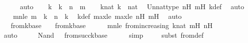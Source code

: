 \begin{isabellebody}
\ \ \ \ \isamarkupfalse%
\ auto\isanewline
\isanewline
\ \ \isamarkupfalse%
\ k\ \ {\isachardoublequoteopen}k\ {\isasymequiv}\ n\ {\isasymunion}\ m{\isachardoublequoteclose}\isanewline
\isanewline
\ \ \isamarkupfalse%
\ knat{\isacharcolon}{\kern0pt}\ {\isachardoublequoteopen}k\ {\isasymin}\ nat{\isachardoublequoteclose}\ \isamarkupfalse%
\ Un{\isacharunderscore}{\kern0pt}nat{\isacharunderscore}{\kern0pt}type\ nH\ mH\ k{\isacharunderscore}{\kern0pt}def\ \isamarkupfalse%
\ auto\isanewline
\ \ \isamarkupfalse%
\ mnle{\isacharcolon}{\kern0pt}\ {\isachardoublequoteopen}m\ {\isasymle}\ k\ {\isasymand}\ n\ {\isasymle}\ k{\isachardoublequoteclose}\ \isamarkupfalse%
\ k{\isacharunderscore}{\kern0pt}def\ max{\isacharunderscore}{\kern0pt}le{}\ max{\isacharunderscore}{\kern0pt}le{}\ nH\ mH\ \isamarkupfalse%
\ auto\isanewline
\ \ \isanewline
\ \ \isamarkupfalse%
\ {\isachardoublequoteopen}{\isasymphi}\ {\isasymin}\ {\isasymDelta}{}{\isacharunderscore}{\kern0pt}from{\isacharcircum}{\kern0pt}k{\isacharparenleft}{\kern0pt}{\isasymDelta}{}{\isacharunderscore}{\kern0pt}base{\isacharparenright}{\kern0pt}\ {\isasymand}\ {\isasympsi}\ {\isasymin}\ {\isasymDelta}{}{\isacharunderscore}{\kern0pt}from{\isacharcircum}{\kern0pt}k{\isacharparenleft}{\kern0pt}{\isasymDelta}{}{\isacharunderscore}{\kern0pt}base{\isacharparenright}{\kern0pt}{\isachardoublequoteclose}\isanewline
\ \ \ \ \isamarkupfalse%
\ mnle\ {\isasymDelta}{}{\isacharunderscore}{\kern0pt}from{\isacharunderscore}{\kern0pt}increasing\ knat\ mH\ nH\ \isanewline
\ \ \ \ \isamarkupfalse%
\ auto\isanewline
\ \ \isamarkupfalse%
\ \isamarkupfalse%
\ {\isachardoublequoteopen}Nand{\isacharparenleft}{\kern0pt}{\isasymphi}{\isacharcomma}{\kern0pt}\ {\isasympsi}{\isacharparenright}{\kern0pt}\ {\isasymin}\ {\isasymDelta}{}{\isacharunderscore}{\kern0pt}from{\isacharcircum}{\kern0pt}succ{\isacharparenleft}{\kern0pt}k{\isacharparenright}{\kern0pt}{\isacharparenleft}{\kern0pt}{\isasymDelta}{}{\isacharunderscore}{\kern0pt}base{\isacharparenright}{\kern0pt}{\isachardoublequoteclose}\isanewline
\ \ \ \ \isamarkupfalse%
\ simp\isanewline
\ \ \ \ \isamarkupfalse%
{\isacharparenleft}{\kern0pt}subst\ {\isasymDelta}{}{\isacharunderscore}{\kern0pt}from{\isacharunderscore}{\kern0pt}def{\isacharparenright}{\kern0pt}\isanewline

\end{isabellebody}
